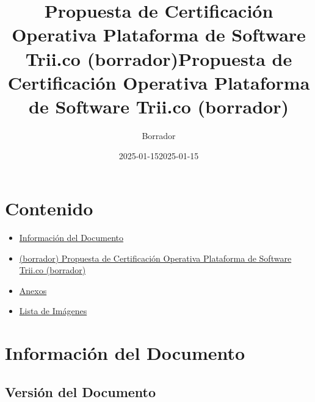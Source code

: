 \documentclass[
  paper=a4,
  ,captions=tableheading
]{scrartcl}
\title{Propuesta de Certificación Operativa Plataforma de Software
Trii.co (borrador)}
\subtitle{Borrador}
\author{}
\date{2025-01-15}
\title{Propuesta de Certificación Operativa Plataforma de Software
Trii.co (borrador)}
\author{}
\date{2025-01-15}
\providecommand{\tightlist}{%
  \setlength{\itemsep}{0pt}\setlength{\parskip}{0pt}}
\begin{document}
\begin{titlepage}
\newcommand{\colorRule}[3][black]{\textcolor[HTML]{#1}{\rule{#2}{#3}}}
\end{titlepage}
\restoregeometry
{}




\section{Contenido}\label{sec:contenido}

\begin{itemize}
\tightlist
\item
  \hyperref[informaciuxf3n-del-documento]{Información del Documento}
\item
  \hyperref[borrador-propuesta-de-certificaciuxf3n-operativa-plataforma-de-software-trii.co-borrador]{(borrador)
  Propuesta de Certificación Operativa Plataforma de Software Trii.co
  (borrador)}
\item
  \hyperref[anexos]{Anexos}
\item
  \hyperref[lista-de-imuxe1genes]{Lista de Imágenes}
\end{itemize}

\newpage

\section{Información del
Documento}\label{sec:informaciuxf3n-del-documento}

\subsection{Versión del Documento}\label{sec:versiuxf3n-del-documento}
\end{document}
